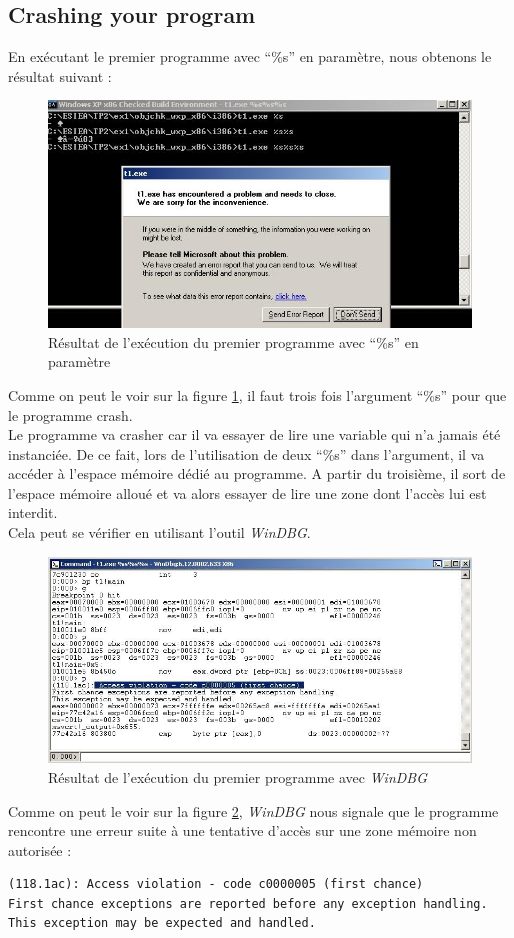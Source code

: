 \subsection{Crashing your program}\label{crash}
En exécutant le premier programme avec \enquote{\%s} en paramètre, nous obtenons le résultat suivant :
\begin{figure}[H]
  \centering
  \includegraphics[width=.9\textwidth]{img/201.JPG}
  \caption{Résultat de l'exécution du premier programme avec \enquote{\%s} en paramètre}
  \label{img:2}
\end{figure}
Comme on peut le voir sur la figure \ref{img:2}, il faut trois fois l'argument \enquote{\%s} pour que le programme crash.\\
Le programme va crasher car il va essayer de lire une variable qui n'a jamais été instanciée. De ce fait, lors de l'utilisation de deux \enquote{\%s} dans l'argument, il va accéder à l'espace mémoire dédié au programme. A partir du troisième, il sort de l'espace mémoire alloué et va alors essayer de lire une zone dont l'accès lui est interdit.\\
Cela peut se vérifier en utilisant l'outil \textit{WinDBG}.
\begin{figure}[H]
  \centering
  \includegraphics[width=.9\textwidth]{img/202.JPG}
  \caption{Résultat de l'exécution du premier programme avec \textit{WinDBG}}
  \label{img:3}
\end{figure}
Comme on peut le voir sur la figure \ref{img:3}, \textit{WinDBG} nous signale que le programme rencontre une erreur suite à une tentative d'accès sur une zone mémoire non autorisée :
\begin{lstlisting}
(118.1ac): Access violation - code c0000005 (first chance)
First chance exceptions are reported before any exception handling.
This exception may be expected and handled.
\end{lstlisting}
